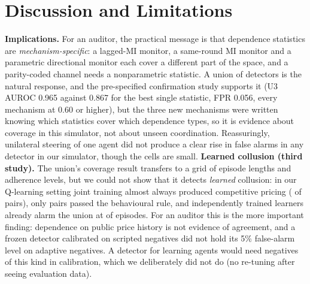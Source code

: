 \documentclass[11pt]{article}
\begin{document}
\section{Discussion and Limitations}\label{sec:disc}
\textbf{Implications.} For an auditor, the practical message is that dependence statistics are \emph{mechanism-specific}: a lagged-MI monitor, a same-round MI monitor and a parametric directional monitor each cover a different part of the space, and a parity-coded channel needs a nonparametric statistic. A union of detectors is the natural response, and the pre-specified confirmation study supports it (U3 AUROC 0.965 against 0.867 for the best single statistic, FPR 0.056, every mechanism at 0.60 or higher), but the three new mechanisms were written knowing which statistics cover which dependence types, so it is evidence about coverage in this simulator, not about unseen coordination. Reassuringly, unilateral steering of one agent did not produce a clear rise in false alarms in any detector in our simulator, though the cells are small.
\textbf{Learned collusion (third study).} The union's coverage result transfers to a grid of episode lengths and adherence levels, but we could not show that it detects \emph{learned} collusion: in our Q-learning setting joint training almost always produced competitive pricing (\fJointCompetitive{} of \fJointPairs{} pairs), only \fPosPairs{} pairs passed the behavioural rule, and independently trained learners already alarm the union at \fAlarmIndUthree{} of episodes. For an auditor this is the more important finding: dependence on public price history is not evidence of agreement, and a frozen detector calibrated on scripted negatives did not hold its 5\% false-alarm level on adaptive negatives. A detector for learning agents would need negatives of this kind in calibration, which we deliberately did not do (no re-tuning after seeing evaluation data).
\end{document}
